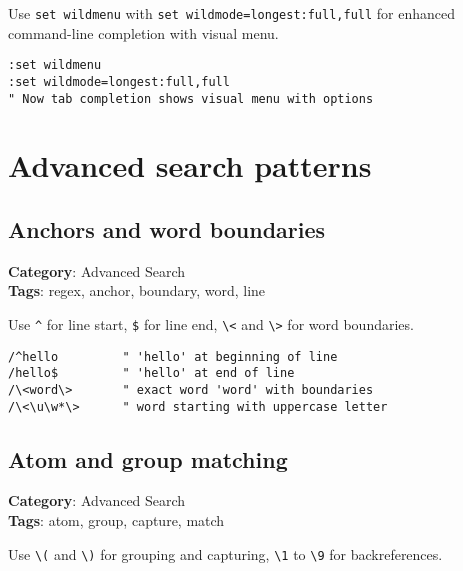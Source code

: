 Use {\footnotesize \Verb§set wildmenu§} with {\footnotesize \Verb§set wildmode=longest:full,full§} for enhanced command-line completion with visual menu.

\begin{Exa*}{}
\begin{Verbatim}[fontsize=\footnotesize, breaklines, breakanywhere]
:set wildmenu
:set wildmode=longest:full,full
" Now tab completion shows visual menu with options
\end{Verbatim}
\end{Exa*}

\chapter{Advanced search patterns}
\section{Anchors and word boundaries}

\textbf{Category}: Advanced Search\\ \textbf{Tags}: regex, anchor, boundary, word, line
\vspace{0.5cm}

Use {\footnotesize \Verb§^§} for line start, {\footnotesize \Verb§$§} for line end, {\footnotesize \Verb§\<§} and {\footnotesize \Verb§\>§} for word boundaries.

\begin{Exa*}{}
\begin{Verbatim}[fontsize=\footnotesize, breaklines, breakanywhere]
/^hello         " 'hello' at beginning of line
/hello$         " 'hello' at end of line
/\<word\>       " exact word 'word' with boundaries
/\<\u\w*\>      " word starting with uppercase letter
\end{Verbatim}
\end{Exa*}

\section{Atom and group matching}

\textbf{Category}: Advanced Search\\ \textbf{Tags}: atom, group, capture, match
\vspace{0.5cm}

Use {\footnotesize \Verb§\(§} and {\footnotesize \Verb§\)§} for grouping and capturing, {\footnotesize \Verb§\1§} to {\footnotesize \Verb§\9§} for backreferences.

